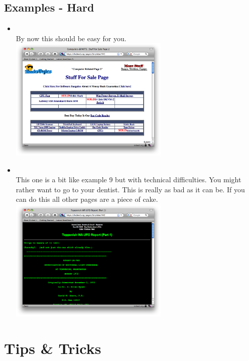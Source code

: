 \documentclass[12pt]{article}
\begin{document}
\subsection{Examples - Hard}
\begin{itemize}
% 
\item {}\\
By now this should be easy for you. \\
\includegraphics[width=0.6\textwidth]{images/441.png} \\

\item {} \\
This one is a bit like example 9 but with technical difficulties. You might rather want to go to your dentist. This is really as bad as it can be. If you can do this all other pages are a piece of cake. \\
\includegraphics[width=0.6\textwidth]{images/442.png} \\

\end{itemize}
\section{Tips \& Tricks}
\label{TnT}
\end{document}
